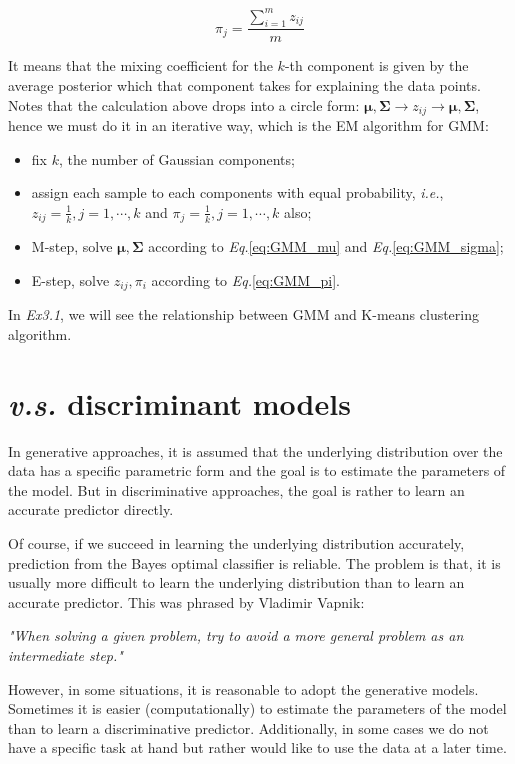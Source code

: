 \documentclass{article}
\begin{document}
	\begin{equation}
	\label{eq:GMM_pi}
	\pi_j=\frac{\sum_{i=1}^m z_{ij}}{m}
	\end{equation}
	
	It means that the mixing coefficient for the $k$-th component is given by the average posterior which that component takes for explaining the data points. Notes that the calculation above drops into a circle form: $\bm{\mu}, \bm{\Sigma} \rightarrow z_{ij} \rightarrow \bm{\mu}, \bm{\Sigma}$, hence we must do it in an iterative way, which is the EM algorithm for GMM:
	
	\begin{itemize}
	\item fix $k$, the number of Gaussian components;
	\item assign each sample to each components with equal probability, \textit{i.e.}, $z_{ij}=\frac{1}{k},j=1,\cdots,k$ and $\pi_j=\frac{1}{k},j=1,\cdots,k$ also;
	\item M-step, solve $\bm{\mu}, \bm{\Sigma}$ according to \textit{Eq.}\ref{eq:GMM_mu} and \textit{Eq.}\ref{eq:GMM_sigma};
	\item E-step, solve $z_{ij},\pi_i$ according to \textit{Eq.}\ref{eq:GMM_pi}.
	\end{itemize}
	
	In \textit{Ex3.1}, we will see the relationship between GMM and K-means clustering algorithm.
	
\section{\textit{v.s.} discriminant models}
	\label{sec:final}
	In generative approaches, it is assumed that the underlying distribution over the data has a specific parametric form and the goal is to estimate the parameters of the model. But in discriminative approaches, the goal is rather to learn an accurate predictor directly. 
	
	Of course, if we succeed in learning the underlying distribution accurately, prediction from the Bayes optimal classifier is reliable. The problem is that, it is usually more difficult to learn the underlying distribution than to learn an accurate predictor. This was phrased by Vladimir Vapnik:
	\begin{center}
	\textit{"When solving a given problem, try to avoid a more general problem as an intermediate step."}
	\end{center}

	However, in some situations, it is reasonable to adopt the generative models. Sometimes it is easier (computationally) to estimate the parameters of the model than to learn a discriminative predictor. Additionally, in some cases we do not have a specific task at hand but rather would like to use the data at a later time.
	
\end{document}
